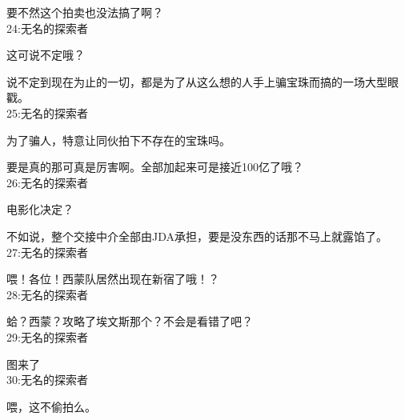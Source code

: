 要不然这个拍卖也没法搞了啊？\\

24:无名的探索者

这可说不定哦？

说不定到现在为止的一切，都是为了从这么想的人手上骗宝珠而搞的一场大型眼戳。\\

25:无名的探索者

为了骗人，特意让同伙拍下不存在的宝珠吗。

要是真的那可真是厉害啊。全部加起来可是接近100亿了哦？\\

26:无名的探索者

电影化决定？

不如说，整个交接中介全部由JDA承担，要是没东西的话那不马上就露馅了。\\

27:无名的探索者

喂！各位！西蒙队居然出现在新宿了哦！？\\

28:无名的探索者

蛤？西蒙？攻略了埃文斯那个？不会是看错了吧？\\

29:无名的探索者

图来了\\

30:无名的探索者

喂，这不偷拍么。\\

